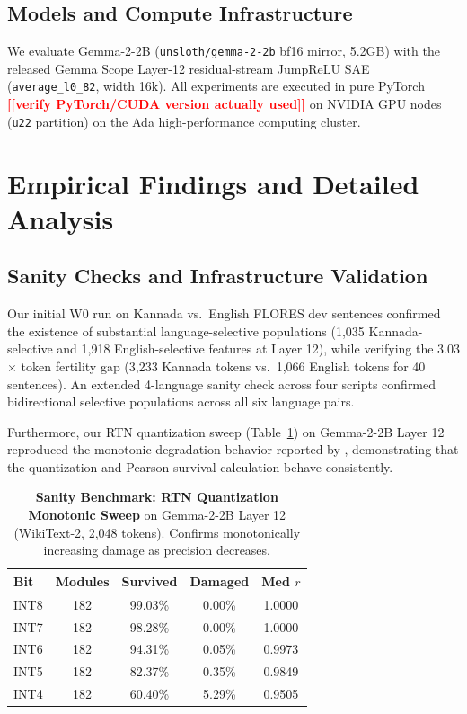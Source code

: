 \documentclass[11pt]{article}
\newcommand{\TODO}[1]{\textbf{\textcolor{red}{[[#1]]}}}
\begin{document}
\subsection{Models and Compute Infrastructure}
We evaluate Gemma-2-2B (\texttt{unsloth/gemma-2-2b} bf16 mirror, 5.2GB) with the released Gemma Scope Layer-12 residual-stream JumpReLU SAE (\texttt{average\_l0\_82}, width 16k). All experiments are executed in pure PyTorch \TODO{verify PyTorch/CUDA version actually used} on NVIDIA GPU nodes (\texttt{u22} partition) on the Ada high-performance computing cluster.

\section{Empirical Findings and Detailed Analysis}

\subsection{Sanity Checks and Infrastructure Validation}
Our initial W0 run on Kannada vs.\ English FLORES dev sentences confirmed the existence of substantial language-selective populations (1,035 Kannada-selective and 1,918 English-selective features at Layer 12), while verifying the 3.03$\times$ token fertility gap (3,233 Kannada tokens vs.\ 1,066 English tokens for 40 sentences). An extended 4-language sanity check across four scripts confirmed bidirectional selective populations across all six language pairs.

Furthermore, our RTN quantization sweep (Table~\ref{tab:rtn_sweep}) on Gemma-2-2B Layer 12 reproduced the monotonic degradation behavior reported by \citet{duan2026perplexity}, demonstrating that the quantization and Pearson survival calculation behave consistently.

\begin{table}[h]
\centering
\small
\setlength{\tabcolsep}{4.5pt}
\begin{tabular}{lcccc}
\toprule
\textbf{Bit} & \textbf{Modules} & \textbf{Survived} & \textbf{Damaged} & \textbf{Med $r$} \\
\midrule
INT8 & 182 & 99.03\% & 0.00\% & 1.0000 \\
INT7 & 182 & 98.28\% & 0.00\% & 1.0000 \\
INT6 & 182 & 94.31\% & 0.05\% & 0.9973 \\
INT5 & 182 & 82.37\% & 0.35\% & 0.9849 \\
INT4 & 182 & 60.40\% & 5.29\% & 0.9505 \\
\bottomrule
\end{tabular}
\caption{\textbf{Sanity Benchmark: RTN Quantization Monotonic Sweep} on Gemma-2-2B Layer 12 (WikiText-2, 2,048 tokens). Confirms monotonically increasing damage as precision decreases.}
\label{tab:rtn_sweep}
\end{table}
\end{document}
